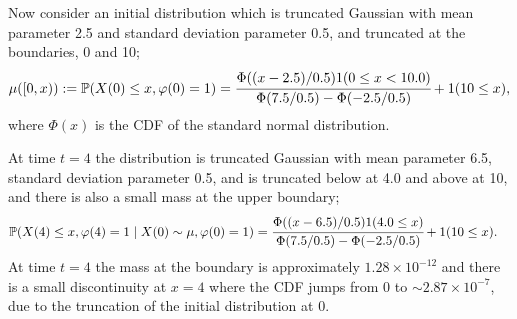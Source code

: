 \begin{example}\label{ex: wave 6}
	Now consider an initial distribution which is truncated Gaussian with mean parameter 2.5 and standard deviation parameter 0.5, and truncated at the boundaries, 0 and 10;
	\begin{align}
		\mu([0,x)) := \mathbb P(X(0)\leq x, \varphi(0)=1)=\cfrac{\Phi((x-2.5)/0.5)1(0 \leq x < 10.0)}{\Phi(7.5/0.5)-\Phi(-2.5/0.5)} + 1(10\leq x), \label{eqn: kdjfksdf}
	\end{align}
	where \(\Phi(x)\) is the CDF of the standard normal distribution.

	At time \(t=4\) the distribution is truncated Gaussian with mean parameter 6.5, standard deviation parameter 0.5, and is truncated below at 4.0 and above at 10, and there is also a small mass at the upper boundary; 
	\begin{align}
		&\mathbb P(X(4)\leq x, \varphi(4)=1\mid X(0)\sim\mu, \varphi(0)=1)  
		=\cfrac{\Phi((x-6.5)/0.5)1(4.0\leq x)}{\Phi(7.5/0.5)-\Phi(-2.5/0.5)} + 1(10 \leq x).\label{eqn: bbbbbaabbaa}%
	\end{align}
	At time \(t=4\) the mass at the boundary is approximately \(1.28\times 10^{-12}\) and there is a small discontinuity at \(x=4\) where the CDF jumps from \(0\) to \(\sim 2.87\times 10^{-7}\), due to the truncation of the initial distribution at \(0\). 


\end{example}
